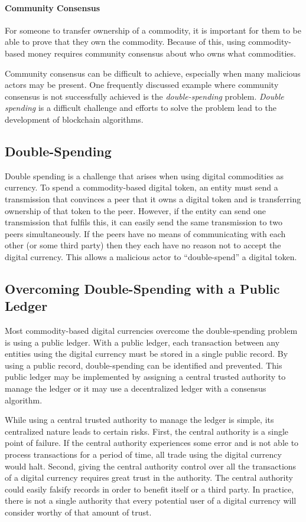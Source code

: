 \documentclass[runningheads]{llncs}
\begin{document}
\paragraph{Community Consensus}
For someone to transfer ownership of a commodity, it is important for them to be able to prove that they own the commodity. Because of this, using commodity-based money requires community consensus about who owns what commodities.

Community consensus can be difficult to achieve, especially when many malicious actors may be present. One frequently discussed example where community consensus is not successfully achieved is the \emph{double-spending} problem. \emph{Double spending} is a difficult challenge and efforts to solve the problem lead to the development of blockchain algorithms. 

\subsection{Double-Spending}
Double spending is a challenge that arises when using digital commodities as currency. To spend a commodity-based digital token, an entity must send a transmission that convinces a peer that it owns a digital token and is transferring ownership of that token to the peer. However, if the entity can send one transmission that fulfils this, it can easily send the same transmission to two peers simultaneously. If the peers have no means of communicating with each other (or some third party) then they each have no reason not to accept the digital currency. This allows a malicious actor to “double-spend” a digital token.

\subsection{Overcoming Double-Spending with a Public Ledger}
Most commodity-based digital currencies overcome the double-spending problem is using a public ledger. With a public ledger, each transaction between any entities using the digital currency must be stored in a single public record. By using a public record, double-spending can be identified and prevented. This public ledger may be implemented by assigning a central trusted authority to manage the ledger or it may use a decentralized ledger with a consensus algorithm. 

While using a central trusted authority to manage the ledger is simple, its centralized nature leads to certain risks. First, the central authority is a single point of failure. If the central authority experiences some error and is not able to process transactions for a period of time, all trade using the digital currency would halt. Second, giving the central authority control over all the transactions of a digital currency requires great trust in the authority. The central authority could easily falsify records in order to benefit itself or a third party. In practice, there is not a single authority that every potential user of a digital currency will consider worthy of that amount of trust.
\end{document}
